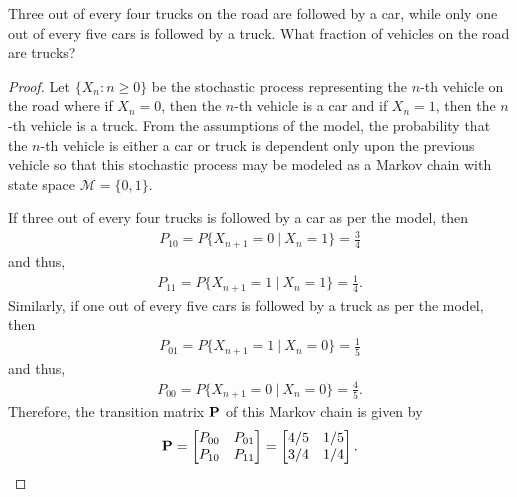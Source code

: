 \begin{problem}{4.30}
  Three out of every four trucks on the road are followed by a car, while only
  one out of every five cars is followed by a truck. What fraction of vehicles
  on the road are trucks?
\end{problem}

\begin{proof}
  Let $\{X_n : n\geq 0\}$ be the stochastic process representing the $n$-th vehicle
  on the road where if $X_n = 0$, then the $n$-th vehicle is a car and if $X_n = 1$,
  then the $n$-th vehicle is a truck. From the assumptions of the model, the probability
  that the $n$-th vehicle is either a car or truck is dependent only upon the previous vehicle
  so that this stochastic process may be modeled as a Markov chain with state space
  $\mathcal{M} = \{0, 1\}$.

  If three out of every four trucks is followed by a car as per the model, then
  \begin{align*}
    P_{10} = P\{X_{n+1} = 0 \ |\ X_n = 1\} = \frac{3}{4}
  \end{align*}
  and thus,
  \begin{align*}
    P_{11} = P\{X_{n+1} = 1 \ |\ X_n = 1\} = \frac{1}{4}.
  \end{align*}
  Similarly, if one out of every five cars is followed by a truck as per the model,
  then
  \begin{align*}
    P_{01} = P\{X_{n+1} = 1 \ |\ X_n = 0\} = \frac{1}{5}
  \end{align*}
  and thus,
  \begin{align*}
    P_{00} = P\{X_{n+1} = 0 \ |\ X_n = 0\} = \frac{4}{5}.
  \end{align*}
  Therefore, the transition matrix $\bold{P}$ of this Markov chain is given by
  \begin{align*}
    \bold{P} =
    \begin{bmatrix}
      P_{00} & P_{01} \\
      P_{10} & P_{11} \\
    \end{bmatrix}
    =
    \begin{bmatrix}
      4/5 & 1/5 \\
      3/4 & 1/4 \\
    \end{bmatrix}.
  \end{align*}


\end{proof}
